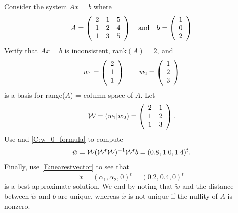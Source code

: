 \documentclass{ximera}
\begin{document}
\begin{example} \rm \label{Ex:nearest_solution}
Consider the system $Ax = b$ where 
\[
A = \left(\begin{array}{rrrrrrrrrrrrrrrrrr} 2 & 1 & 5 \\ 1 & 2 & 4\\ 1& 3 & 5 \end{array}\right)  \quad\mbox{and}\quad b = \left(\begin{array}{rrrrrrrrrrrrrrrrrr}  1\\ 0 \\ 2 \end{array}\right)
\]
Verify that $Ax = b$ is inconsistent, rank$(A) = 2$, and 
\[
w_1 = \left(\begin{array}{rrrrrrrrrrrrrrrrrr} 2 \\ 1\\ 1 \end{array}\right) \qquad w_2 = \left(\begin{array}{rrrrrrrrrrrrrrrrrr} 1 \\ 2\\ 3 \end{array}\right)
\]
is a basis for range($A$) = column space of $A$.  Let
\[
\mathcal{W} = (w_1 | w_2) = \left(\begin{array}{rrrrrrrrrrrrrrrrrr} 2 & 1 \\ 1 & 2 \\ 1 & 3 \end{array}\right).
\]
Use \Matlab and \eqref{C:w_0_formula} to compute 
\[
\tilde{w} =  \mathcal{W} (\mathcal{W}^t\mathcal{W} )^{-1} \mathcal{W}^t b = (0.8, 1.0, 1.4)^t.
\]
Finally, use \eqref{E:nearestvector} to see that
\[
\tilde{x} = (\alpha_1,\alpha_2,0)^t = (0.2, 0.4, 0)^t
\]
is a best approximate solution. We end by noting that $\tilde{w}$ and 
the distance between $\tilde{w}$ and $b$ are unique, whereas 
$\tilde{x}$ is not unique if the nullity of $A$ is nonzero. 
\end{example}



\end{document}
